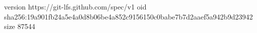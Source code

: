 version https://git-lfs.github.com/spec/v1
oid sha256:19a901fb24a5e4a0d8b06be4a852c9156150c0babe7b7d2aaef5a942b9d23942
size 87544
